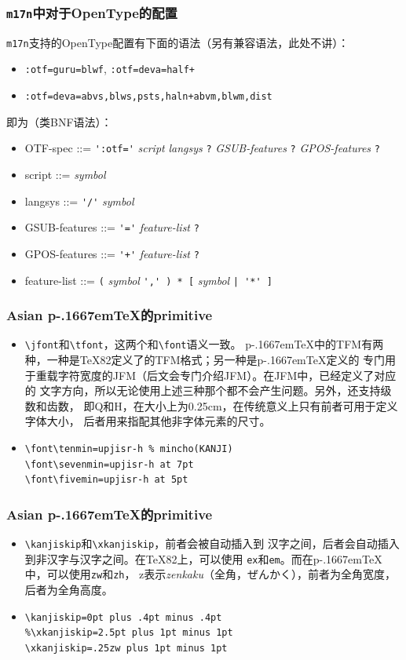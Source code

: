 \documentclass[dvipdfmx]{beamer}
\newcommand{\pTeX}{p\kern-.1667em\TeX}
\newcommand{\ptexng}{Asian \pTeX}
\begin{document}
%
\begin{frame}[fragile]
\frametitle{\texttt{m17n}中对于OpenType的配置}
\texttt{m17n}支持的OpenType配置有下面的语法（另有兼容语法，此处不讲）：
\begin{itemize}
\item \verb!:otf=guru=blwf!, \verb!:otf=deva=half+!
\item \verb!:otf=deva=abvs,blws,psts,haln+abvm,blwm,dist!
\end{itemize}
即为（类BNF语法）：
\begin{itemize}
\item OTF-spec ::= \verb!':otf='! \textit{script} \textit{langsys} \verb!?!
\textit{GSUB-features} \verb!?! \textit{GPOS-features} \verb!?!
\item script ::= \textit{symbol}
\item langsys ::= \verb!'/'! \textit{symbol}
\item GSUB-features ::= \verb!'='! \textit{feature-list} \verb!?!
\item GPOS-features ::= \verb!'+'! \textit{feature-list} \verb!?!
\item feature-list ::= \verb!(! \textit{symbol} \verb!',' ) * [! \textit{symbol} \verb!| '*' ]!
\end{itemize}
\end{frame}
%
\begin{frame}[fragile]
\frametitle{\ptexng 的primitive}
\begin{itemize}
\item \verb!\jfont!和\verb!\tfont!，这两个和\verb!\font!语义一致。
\pTeX 中的TFM有两种，一种是\TeX82定义了的TFM格式；另一种是\pTeX 定义的
专门用于重载字符宽度的JFM（后文会专门介绍JFM）。在JFM中，已经定义了对应的
文字方向，所以无论使用上述三种那个都不会产生问题。另外，还支持级数和齿数，
即Q和H，在大小上为0.25cm，在传统意义上只有前者可用于定义字体大小，
后者用来指配其他非字体元素的尺寸。
\item \begin{verbatim}
\font\tenmin=upjisr-h % mincho(KANJI)
\font\sevenmin=upjisr-h at 7pt
\font\fivemin=upjisr-h at 5pt
\end{verbatim}
\end{itemize}
\end{frame}
%
\begin{frame}[fragile]
\frametitle{\ptexng 的primitive}
\begin{itemize}
\item \verb!\kanjiskip!和\verb!\xkanjiskip!，前者会被自动插入到
汉字之间，后者会自动插入到非汉字与汉字之间。在\TeX82上，可以使用
\texttt{ex}和\texttt{em}。而在\pTeX 中，可以使用\texttt{zw}和\texttt{zh}，
z表示\textit{zenkaku}（全角，ぜんかく），前者为全角宽度，后者为全角高度。
\item \begin{verbatim}
\kanjiskip=0pt plus .4pt minus .4pt
%\xkanjiskip=2.5pt plus 1pt minus 1pt
\xkanjiskip=.25zw plus 1pt minus 1pt
\end{verbatim}
\end{itemize}
\end{frame}
\end{document}
